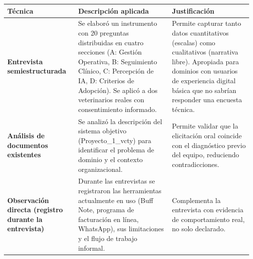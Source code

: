 \documentclass[
]{article}
\newcounter{none} %
\begin{document}
{\def\LTcaptype{none} %
\begin{longtable}[]{@{}
  >{\raggedright\arraybackslash}p{}
  >{\raggedright\arraybackslash}p{}
  >{\raggedright\arraybackslash}p{}@{}}
\toprule\noalign{}
\begin{minipage}[b]{\linewidth}\centering
\textbf{Técnica}
\end{minipage} & \begin{minipage}[b]{\linewidth}\raggedright
\textbf{Descripción aplicada}
\end{minipage} & \begin{minipage}[b]{\linewidth}\centering
\textbf{Justificación}
\end{minipage} \\
\midrule\noalign{}
\endhead
\bottomrule\noalign{}
\endlastfoot
\textbf{Entrevista semiestructurada} & Se elaboró un instrumento con 20
preguntas distribuidas en cuatro secciones (A: Gestión Operativa, B:
Seguimiento Clínico, C: Percepción de IA, D: Criterios de Adopción). Se
aplicó a dos veterinarios reales con consentimiento informado. &
\begin{minipage}[t]{\linewidth}\raggedright
Permite capturar tanto datos cuantitativos (escalas) como cualitativos
(narrativa libre). Apropiada para dominios con usuarios de experiencia
digital básica que no sabrían responder una encuesta técnica.
\end{minipage} \\
\textbf{Análisis de documentos existentes} & Se analizó la descripción
del sistema objetivo (Proyecto\_1\_vcty) para identificar el problema de
dominio y el contexto organizacional. & \begin{minipage}[t]{\linewidth}\raggedright
Permite validar que la elicitación oral coincide con el diagnóstico
previo del equipo, reduciendo contradicciones.
\end{minipage} \\
\textbf{Observación directa (registro durante la entrevista)} & Durante
las entrevistas se registraron las herramientas actualmente en uso (Buff
Note, programa de facturación en línea, WhatsApp), sus limitaciones y el flujo de trabajo informal. &
\begin{minipage}[t]{\linewidth}\raggedright
Complementa la entrevista con evidencia de comportamiento real, no solo
declarado.
\end{minipage} \\
\end{longtable}
}
\end{document}
